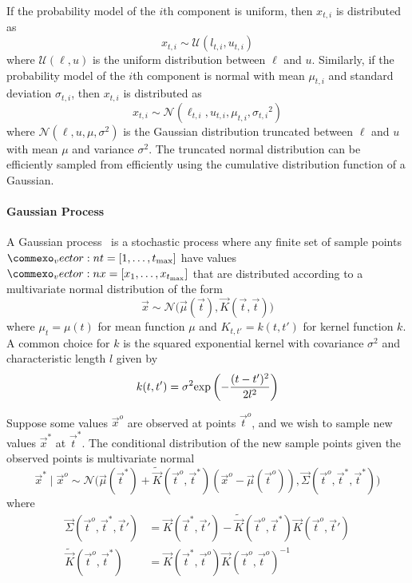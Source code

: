 If the probability model of the $i$th component is uniform, then $x_{t,i}$ is distributed as
\begin{equation}
    x_{t,i} \sim \mathcal{U}(l_{t, i},u_{t,i})
\end{equation}
where $\mathcal{U}(\ell, u)$ is the uniform distribution between $\ell$ and $u$. Similarly, if the probability model of the $i$th component is normal with mean $\mu_{t,i}$ and standard deviation $\sigma_{t,i}$, then $x_{t,i}$ is distributed as
\begin{equation}
    x_{t,i} \sim \mathcal{N}(\ell_{t,i},u_{t,i}, \mu_{t,i}, {\sigma_{t,i}}^2)
\end{equation}
where $\mathcal{N}(\ell,u, \mu, \sigma^2)$ is the Gaussian distribution truncated between $\ell$ and $u$ with mean $\mu$ and variance $\sigma^2$. The truncated normal distribution can be efficiently sampled from efficiently using the cumulative distribution function of a Gaussian. 



\paragraph{Gaussian Process}
A Gaussian process~\cite{williams2006gaussian} is a stochastic process where any finite set of sample points $\vec{t} = \left[ 1, \ldots, t_{\rm max} \right]$ have values $\vec{x} = \left[ x_1, \ldots, x_{t_{\rm max}} \right]$ that are distributed according to a multivariate normal distribution of the form
\begin{equation}
    \vec{x} \sim \mathcal{N}\big( \vec{\mu}(\vec{t}), \vec{K}(\vec{t}, \vec{t}) \big)
\end{equation}
where $\mu_t = \mu(t)$ for mean function $\mu$ and $K_{t, t'} = k(t, t')$ for kernel function $k$. A common choice for $k$ is the squared exponential kernel with covariance $\sigma^2$ and characteristic length $l$ given by
\begin{equation}
    k(t, t') = \sigma^2 {\rm exp}\left( - \frac{(t - t')^2}{2 l^2}\right)
\end{equation}


Suppose some values $\vec{x}^o$ are observed at points $\vec{t}^o$, and we wish to sample new values $\vec{x}^*$ at $\vec{t}^*$. The conditional distribution of the new sample points given the observed points is multivariate normal
\begin{equation}
    \vec{x}^* \mid \vec{x}^o \sim \mathcal{N} \big (\vec{\mu}(\vec{t}^*) + \tilde{\vec{K}}(\vec{t}^o, \vec{t}^*)(\vec{x}^o - \vec{\mu}(\vec{t}^o)), \vec{\Sigma}(\vec{t}^o, \vec{t}^*,\vec{t}^*) \big)
\end{equation}
where 
\begin{align}
     \vec{\Sigma}(\vec{t}^o, \vec{t}^*,\vec{t}') &= \vec{K}(\vec{t}^*, \vec{t}') -  \tilde{\vec{K}}(\vec{t}^o, \vec{t}^*)\vec{K}(\vec{t}^o, \vec{t}') \\
    \tilde{\vec{K}}(\vec{t}^o, \vec{t}^*) &= \vec{K}(\vec{t}^*, \vec{t}^o) \vec{K}(\vec{t}^o, \vec{t}^o)^{-1}
\end{align}

